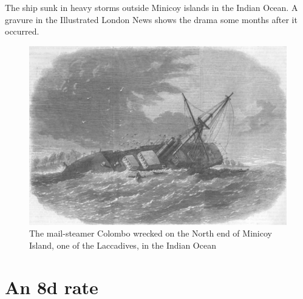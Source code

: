 \documentclass[justified]{tufte-book}
\begin{document}
The ship sunk in heavy storms outside Minicoy islands in the Indian Ocean. A gravure in the Illustrated London News shows the drama some months after it occurred.

\begin{landscape}
\begin{figure}[p]
\centering
\includegraphics[height=0.9\textheight]{./graphics/NZ/colombo}
\caption{The mail-steamer Colombo wrecked on the North end of Minicoy Island, one of the Laccadives, in the Indian Ocean}
\end{figure}
\end{landscape}


\endflushleft















\section{An 8d rate}



\end{document}
